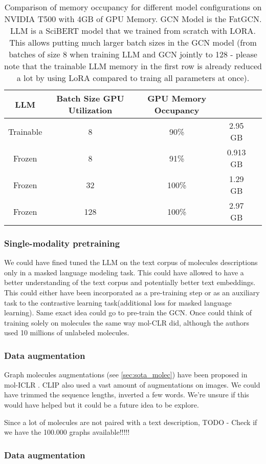 \begin{table*}[h]
    \centering
    \begin{tabular}{ccccc}
    \hline
    \textbf{LLM} & \textbf{Batch Size} \textbf{GPU Utilization}& \textbf{GPU Memory Occupancy} \\ \hline
    Trainable & 8 & 90\% & 2.95 GB \\
    Frozen & 8 & 91\% & 0.913 GB \\
    Frozen & 32 & 100\% & 1.29 GB \\
    Frozen & 128 & 100\% & 2.97 GB \\
    \hline
    \end{tabular}
    \caption{Comparison of memory occupancy for different model configurations on NVIDIA T500 with 4GB of GPU Memory. GCN Model is the FatGCN. LLM is a SciBERT model that we trained from scratch with LORA. This allows putting much larger batch sizes in the GCN model (from batches of size 8 when training LLM and GCN jointly to 128 - please note that the trainable LLM memory in the first row is already reduced a lot by using LoRA compared to traing all parameters at once).}
    \label{table:ft_gcn_model_memory_occupancy}
\end{table*}

\subsubsection*{Single-modality pretraining}
We could have fined tuned the LLM on the text corpus of molecules descriptions only in a masked language modeling task. This could have allowed to have a better understanding of the text corpus and potentially better text embeddings. This could either have been incorporated as a pre-training step or as an auxiliary task to the contrastive learning task(additional loss for masked language learning).
Same exact idea could go to pre-train the GCN. Once could think of training solely on molecules the same way mol-CLR \cite{molCLR} did, although the authors used 10 millions of unlabeled molecules.

\subsubsection*{Data augmentation}
Graph molecules augmentations (see \ref{sec:sota_molec}) have been proposed in mol-ICLR \cite{molCLR} . CLIP \cite{CLIP} also used a vast amount of augmentations on images. We could have trimmed the sequence lengths, inverted a few words. We're unsure if this would have helped but it could be a future idea to be explore.

Since a lot of molecules are not paired with a text description, 
\color{red}TODO - Check if we have the 100.000 graphs available!!!!!\color{black}


\subsubsection*{Data augmentation}